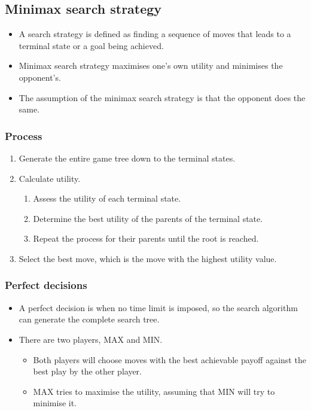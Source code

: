 \documentclass[11pt]{article}
\begin{document}
 \newpage
\subsection{Minimax search strategy}
\label{sec:orgd53bc3c}
\begin{itemize}
\item A search strategy is defined as finding a sequence of moves that leads to a terminal state or a goal being achieved.
\item Minimax search strategy maximises one's own utility and minimises the opponent's.
\item The assumption of the minimax search strategy is that the opponent does the same.
\end{itemize}
\subsubsection{Process}
\label{sec:org9ab8323}
\begin{enumerate}
\item Generate the entire game tree down to the terminal states.
\item Calculate utility.
\begin{enumerate}
\item Assess the utility of each terminal state.
\item Determine the best utility of the parents of the terminal state.
\item Repeat the process for their parents until the root is reached.
\end{enumerate}
\item Select the best move, which is the move with the highest utility value.
\end{enumerate}

 \newpage
\subsubsection{Perfect decisions}
\label{sec:org6aaac5c}
\begin{itemize}
\item A perfect decision is when no time limit is imposed, so the search algorithm can generate the complete search tree.
\item There are two players, MAX and MIN.
\begin{itemize}
\item Both players will choose moves with the best achievable payoff against the best play by the other player.
\item MAX tries to maximise the utility, assuming that MIN will try to minimise it.
\end{itemize}
\end{itemize}
\end{document}
